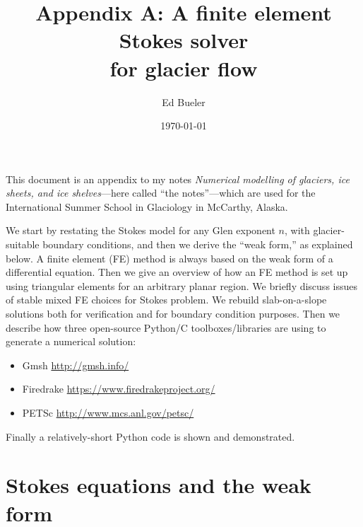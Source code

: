 \documentclass[letterpaper,final,12pt,reqno]{amsart}
\begin{document}
\graphicspath{{../figures/}}

\title{Appendix A: A finite element Stokes solver \\ for glacier flow}

\author{Ed Bueler}

\date{\today}

\maketitle

\renewcommand{\theequation}{A\arabic{equation}}


This document is an appendix to my notes \emph{Numerical modelling of glaciers, ice sheets, and ice shelves}---here called ``the notes''---which are used for the International Summer School in Glaciology in McCarthy, Alaska.

We start by restating the Stokes model for any Glen exponent $n$, with glacier-suitable boundary conditions, and then we derive the ``weak form,'' as explained below.  A finite element (FE) method \cite{Elmanetal2014} is always based on the weak form of a differential equation.  Then we give an overview of how an FE method is set up using triangular elements for an arbitrary planar region.  We briefly discuss issues of stable mixed FE choices for Stokes problem.  We rebuild slab-on-a-slope solutions both for verification and for boundary condition purposes.  Then we describe how three open-source Python/C toolboxes/libraries are using to generate a numerical solution:
\begin{itemize}
\item  Gmsh \hfill \url{http://gmsh.info/}
\item Firedrake \hfill \url{https://www.firedrakeproject.org/}
\item PETSc \hfill \url{http://www.mcs.anl.gov/petsc/}
\end{itemize}
Finally a relatively-short Python code is shown and demonstrated.

\section{Stokes equations and the weak form}
\end{document}
